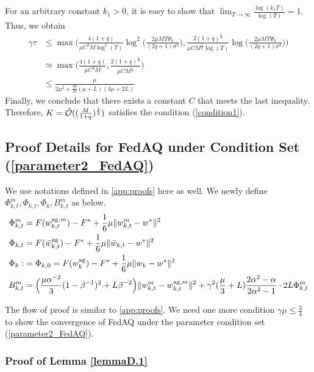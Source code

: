 \documentclass[11pt]{article}
\begin{document}
For an arbitrary constant $k_1 > 0$, it is easy to show that $\lim_{T \rightarrow \infty} \frac{\log(k_1 T)}{\log(T)} = 1$. Thus, we obtain
\begin{align*}
    \gamma\tau &\leq \max\Big(\frac{4(1+q)}{\mu C^2M\log^2(T)}\log^2\Big(\frac{2\mu M T \Psi_0}{(2q+1)\sigma^2}\Big), \frac{2(1+q)^{\frac{1}{2}}}{\mu CM^{\frac{1}{2}}\log(T)}\log\Big(\frac{2\mu M T \Psi_0}{(2q+1)\sigma^2} \Big)\Big) \\
    &\simeq \max\Big(\frac{4(1+q)}{\mu C^2M}, \frac{2(1+q)^{\frac{1}{2}}}{\mu CM^{\frac{1}{2}}}\Big) \\
    &\leq \frac{\mu}{2\mu^2+\frac{2q}{M}(\mu+L)(4\mu+2L)}
\end{align*}
Finally, we conclude that there exists a constant $C$ that meets the last inequality. Therefore, $K = \Tilde{\mathcal{O}}((\frac{M}{1+q})^{\frac{1}{2}})$ satisfies the condition (\ref{condition1}).

\subsection{Proof Details for FedAQ under Condition Set (\ref{parameter2_FedAQ})}
\label{app:proofs2}

We use notations defined in \cref{app:proofs} here as well. We newly define $\Phi_{k, t}^m, \Phi_{k, t}, \Phi_k, B_{k, t}^m$ as below.
\begin{align*}
    \Phi_{k, t}^m &= F(w_{k, t}^{\textrm{ag}, m}) - F^* + \frac{1}{6} \mu \|w_{k, t}^m - w^*\|^2\\
    \Phi_{k, t} &= F(\Bar{w}_{k, t}^{\textrm{ag}}) -F^* + \frac{1}{6} \mu \|\Bar{w}_{k, t} - w^*\|^2 \\
    \Phi_k :&= \Phi_{k, 0} = F(w_k^{\textrm{ag}}) - F^* + \frac{1}{6} \mu \|w_k - w^*\|^2 \\
    B_{k, t}^m &= \Big( \frac{\mu\alpha^{-2}}{3}(1-\beta^{-1})^2 + L\beta^{-2}\Big)\|w_{k, t}^m - w_{k, t}^{\textrm{ag}, m}\|^2 + \gamma^2(\frac{\mu}{3} + L)\frac{2\alpha^2-\alpha}{2\alpha^2-1}\cdot 2L \Phi_{k, t}^m
\end{align*}

The flow of proof is similar to \cref{app:proofs}. We need one more condition $\gamma\mu \leq \frac{3}{4}$ to show the convergence of FedAQ under the parameter condition set (\ref{parameter2_FedAQ}).

\subsubsection{Proof of Lemma \ref{lemmaD.1}}
\label{app:proof_lemma2}
\end{document}
